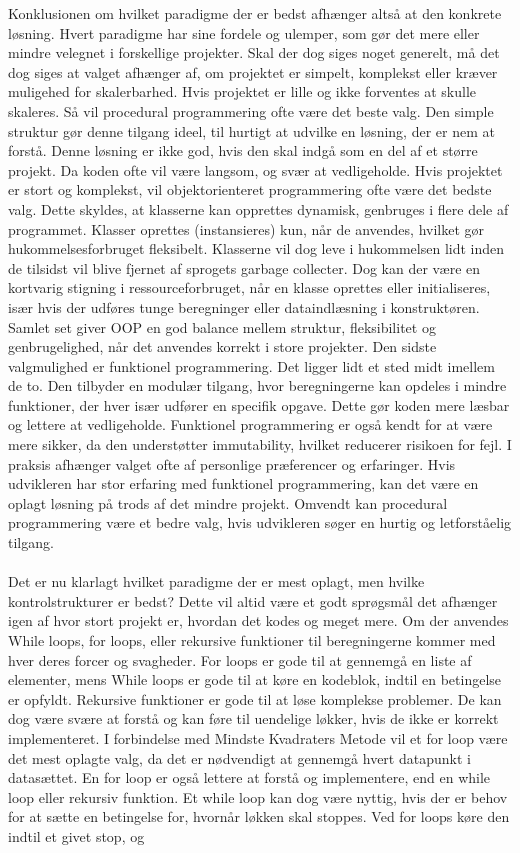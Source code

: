 Konklusionen om hvilket paradigme der er bedst afhænger altså at den konkrete løsning. Hvert paradigme har sine fordele og ulemper, som gør det mere eller mindre velegnet i forskellige projekter. Skal der dog siges noget generelt, må det dog siges at valget afhænger af, om projektet er simpelt, komplekst eller kræver muligehed for skalerbarhed. Hvis projektet er lille og ikke forventes at skulle skaleres. Så vil procedural programmering ofte være det beste valg. Den simple struktur gør denne tilgang ideel, til hurtigt at udvilke en løsning, der er nem at forstå. Denne løsning er ikke god, hvis den skal indgå som en del af et større projekt. Da koden ofte vil være langsom, og svær at vedligeholde. Hvis projektet er stort og komplekst, vil objektorienteret programmering ofte være det bedste valg. Dette skyldes, at klasserne kan opprettes dynamisk, genbruges i flere dele af programmet. Klasser oprettes (instansieres) kun, når de anvendes, hvilket gør hukommelsesforbruget fleksibelt. Klasserne vil dog leve i hukommelsen lidt inden de tilsidst vil blive fjernet af sprogets garbage collecter. Dog kan der være en kortvarig stigning i ressourceforbruget, når en klasse oprettes eller initialiseres, især hvis der udføres tunge beregninger eller dataindlæsning i konstruktøren. Samlet set giver OOP en god balance mellem struktur, fleksibilitet og genbrugelighed, når det anvendes korrekt i store projekter. Den sidste valgmulighed er funktionel programmering. Det ligger lidt et sted midt imellem de to. Den tilbyder en modulær tilgang, hvor beregningerne kan opdeles i mindre funktioner, der hver især udfører en specifik opgave. Dette gør koden mere læsbar og lettere at vedligeholde. Funktionel programmering er også kendt for at være mere sikker, da den understøtter immutability, hvilket reducerer risikoen for fejl. I praksis afhænger valget ofte af personlige præferencer og erfaringer. Hvis udvikleren har stor erfaring med funktionel programmering, kan det være en oplagt løsning på trods af det mindre projekt. Omvendt kan procedural programmering være et bedre valg, hvis udvikleren søger en hurtig og letforståelig tilgang.\\\\ Det er nu klarlagt hvilket paradigme der er mest oplagt, men hvilke kontrolstrukturer er bedst? Dette vil altid være et godt sprøgsmål det afhænger igen af hvor stort projekt er, hvordan det kodes og meget mere. Om der anvendes While loops, for loops, eller rekursive funktioner til beregningerne kommer med hver deres forcer og svagheder. For loops er gode til at gennemgå en liste af elementer, mens While loops er gode til at køre en kodeblok, indtil en betingelse er opfyldt. Rekursive funktioner er gode til at løse komplekse problemer. De kan dog være svære at forstå og kan føre til uendelige løkker, hvis de ikke er korrekt implementeret. I forbindelse med Mindste Kvadraters Metode vil et for loop være det mest oplagte valg, da det er nødvendigt at gennemgå hvert datapunkt i datasættet. En for loop er også lettere at forstå og implementere, end en while loop eller rekursiv funktion. Et while loop kan dog være nyttig, hvis der er behov for at sætte en betingelse for, hvornår løkken skal stoppes. Ved for loops køre den indtil et givet stop, og 